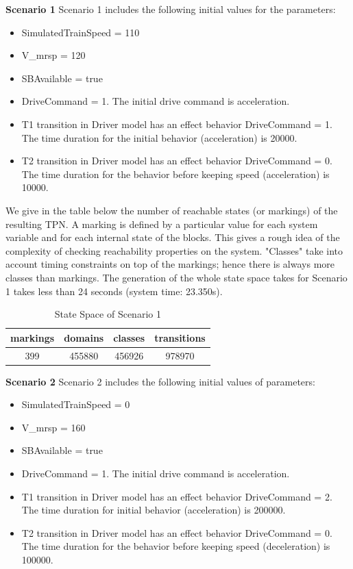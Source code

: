 \textbf{Scenario 1}
Scenario 1 includes the following initial values for the parameters:
\begin{itemize}
\item
SimulatedTrainSpeed = 110
\item
V\_mrsp = 120
\item
SBAvailable = true
\item
DriveCommand = 1. The initial drive command is acceleration. 
\item
T1 transition in Driver model has an effect behavior DriveCommand = 1. The time duration for the initial behavior (acceleration) is 20000. 
\item
T2 transition in Driver model has an effect behavior DriveCommand = 0. The time duration for the behavior before keeping speed (acceleration) is 10000. 
\end{itemize}

We give in the table below the number of reachable states (or
markings) of the resulting TPN. A marking is defined by a particular
value for each system variable and for each internal state of the
blocks. This gives a rough idea of the complexity of checking
reachability properties on the system. "Classes" take into account
timing constraints on top of the markings; hence there is always more
classes than markings. The generation of the whole state space takes
for Scenario 1 takes
less than 24 seconds (system time: 23.350s).\\

\begin{table}[ht!]
\footnotesize
\caption{State Space of Scenario 1}
\begin{center}
  \begin{tabular}{|c|c|c|c|}
    \hline
    markings & domains & classes & transitions \\
    \hline
    399 & 455880 & 456926 & 978970 \\ 
    \hline
  \end{tabular}
\end{center}
\end{table}

\textbf{Scenario 2}
Scenario 2 includes the following initial values of parameters:
\begin{itemize}
\item
SimulatedTrainSpeed = 0
\item
V\_mrsp = 160
\item
SBAvailable = true
\item
DriveCommand = 1. The initial drive command is acceleration. 
\item
T1 transition in Driver model has an effect behavior DriveCommand = 2. The time duration for initial behavior (acceleration) is 200000. 
\item
T2 transition in Driver model has an effect behavior DriveCommand = 0. The time duration for the behavior before keeping speed (deceleration) is 100000. 
\end{itemize}

